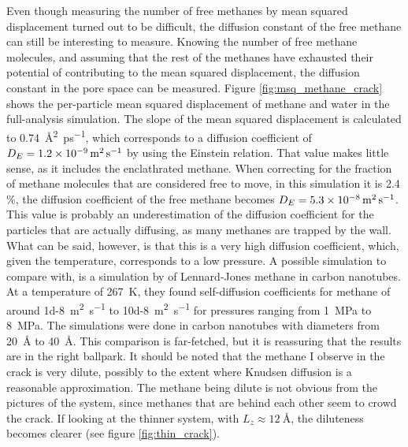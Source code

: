 Even though measuring the number of free methanes by mean squared displacement turned out to be difficult, the diffusion constant of the free methane can still be interesting to measure. Knowing the number of free methane molecules, and assuming that the rest of the methanes have exhausted their potential of contributing to the mean squared displacement, the diffusion constant in the pore space can be measured. Figure \ref{fig:msq_methane_crack} shows the per-particle mean squared displacement of methane and water in the full-analysis simulation. The slope of the mean squared displacement is calculated to \SI{0.74}{\angstrom\squared\per\pico\second}, which corresponds to a diffusion coefficient of $D_E = \SI{1.2d-9}{\meter\squared\per\second}$ by using the Einstein relation. That value makes little sense, as it includes the enclathrated methane. When correcting for the fraction of methane molecules that are considered free to move, in this simulation it is 2.4 \%, the diffusion coefficient of the free methane becomes $D_E = \SI{5.3d-8}{\meter\squared\per\second}$. This value is probably an underestimation of the diffusion coefficient for the particles that are actually diffusing, as many methanes are trapped by the wall. What can be said, however, is that this is a very high diffusion coefficient, which, given the temperature, corresponds to a low pressure. A possible simulation to compare with, is a simulation by \citet{Cao2004} of Lennard-Jones methane in carbon nanotubes. At a temperature of \SI{267}{\kelvin}, they found self-diffusion coefficients for methane of around \SI{1d-8}{\meter\squared\per\second} to \SI{10d-8}{\meter\squared\per\second} for pressures ranging from \SI{1}{\mega\pascal} to \SI{8}{\mega\pascal}. The simulations were done in carbon nanotubes with diameters from \SI{20}{\angstrom} to \SI{40}{\angstrom}. This comparison is far-fetched, but it is reassuring that the results are in the right ballpark. It should be noted that the methane I observe in the crack is very dilute, possibly to the extent where Knudsen diffusion is a reasonable approximation. The methane being dilute is not obvious from the pictures of the system, since methanes that are behind each other seem to crowd the crack. If looking at the thinner system, with $L_z \approx \SI{12}{\angstrom}$, the diluteness becomes clearer (see figure \ref{fig:thin_crack}).

